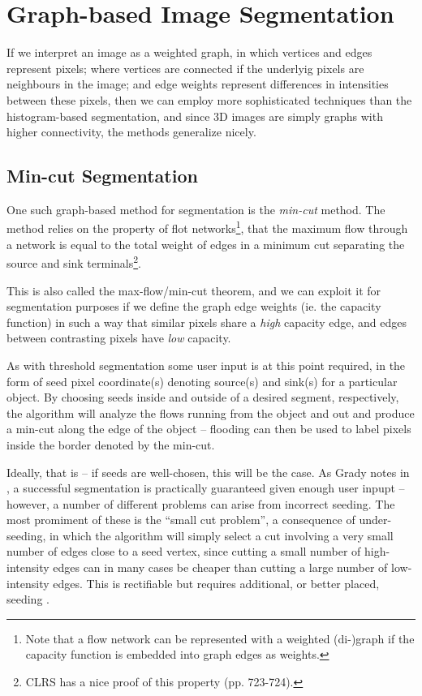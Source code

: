 \section{Graph-based Image Segmentation}

If we interpret an image as a weighted graph, in which vertices and edges
represent pixels; where vertices are connected if the underlyig pixels are
neighbours in the image; and edge weights represent differences in intensities
between these pixels, then we can employ more sophisticated techniques than the
histogram-based segmentation, and since 3D images are simply graphs with higher
connectivity, the methods generalize nicely.

\subsection{Min-cut Segmentation}

One such graph-based method for segmentation is the \textit{min-cut} method. The
method relies on the property of flot networks\footnote{Note that a flow
network can be represented with a weighted (di-)graph if
the capacity function is embedded into graph edges as weights.}, that the
maximum flow through a network is equal to the total weight of edges in a
minimum cut separating the source and sink terminals\footnote{CLRS\cite{clrs}
has a nice proof of this property (pp. 723-724).}.

This is also called the max-flow/min-cut theorem, and we can exploit it for
segmentation purposes if we define the graph edge weights (ie. the capacity
function) in such a way that similar pixels share a \textit{high} capacity edge,
and edges between contrasting pixels have \textit{low} capacity.

As with threshold segmentation some user input is at this point required, in the
form of seed pixel coordinate(s) denoting source(s) and sink(s) for a particular
object. By choosing seeds inside and outside of a desired segment, respectively,
the algorithm will analyze the flows running from the object and out and produce
a min-cut along the edge of the object -- flooding can then be
used to label pixels inside the border denoted by the min-cut. 

\medskip

Ideally, that is -- if seeds are well-chosen, this will be the case. As Grady
notes in \cite{grady}, a successful segmentation is practically guaranteed given
enough user inpupt -- however, a number of different problems can arise from
incorrect seeding. The most promiment of these is the ``small cut problem'', a
consequence of under-seeding, in which the algorithm will simply select a cut
involving a very small number of edges close to a seed vertex, since cutting a
small number of high-intensity edges can in many cases be cheaper than cutting a
large number of low-intensity edges. This is rectifiable but requires
additional, or better placed, seeding \cite{grady}.


